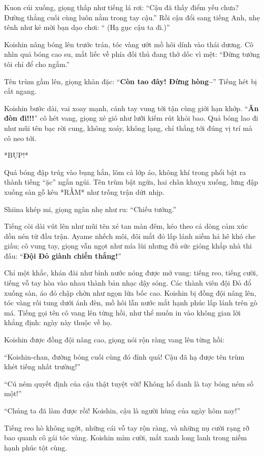 \documentclass[../main.tex]{subfiles}
\begin{document}
Kuon cúi xuống, giọng thấp như tiếng lá rơi: ``Cậu đã thấy điểm yếu chưa? Đường thẳng cuối cùng luôn nằm trong tay cậu.'' Rồi cậu đổi sang tiếng Anh, nhẹ tênh như kẻ mời bạn dạo chơi: `` (Hạ gục cậu ta đi.)''

Koishin nâng bóng lên trước trán, tóc vàng ướt mồ hôi dính vào thái dương. Cô nhìn quả bóng cao su, mắt liếc về phía đối thủ đang thở dốc vì mệt:  ``Đừng tưởng tôi chỉ để cho ngắm.''

Tên trùm gầm lên, giọng khàn đặc: ``\textbf{Còn tao đây! Đừng hòng--}'' Tiếng hét bị cắt ngang.

Koishin bước dài, vai xoay mạnh, cánh tay vung tới tận cùng giới hạn khớp. ``\textbf{Ăn đòn đi!!!}'' cô hét vang, giọng xé gió như lưỡi kiếm rút khỏi bao. Quả bóng lao đi như mũi tên bạc rời cung, không xoáy, không lạng, chỉ thẳng tới đúng vị trí mà cô neo tới.

*BỤP!*

Quả bóng đập trúg vào bụng hắn, lõm cả lớp áo, không khí trong phổi bật ra thành tiếng ``ặc'' ngắn ngủi. Tên trùm bật ngửa, hai chân khuỵu xuống, lưng đập xuống sàn gỗ kêu *RẦM* như trống trận dứt nhịp.

Shiina khép mi, giọng ngân nhẹ như ru: ``Chiếu tướng.''

Tiếng còi dài vút lên như mũi tên xé tan màn đêm, kéo theo cả dòng cảm xúc dồn nén từ đầu trận. Ayame nhếch môi, đôi mắt đỏ lấp lánh niềm hả hê khó che giấu; cô vung tay, giọng vẫn ngọt như mía lùi nhưng đủ sức gióng khắp nhà thi đấu: ``\textbf{Đội Đỏ giành chiến thắng!}''

Chỉ một khắc, khán đài như bình nước nóng được mở vung: tiếng reo, tiếng cười, tiếng vỗ tay hòa vào nhau thành bản nhạc dậy sóng. Các thành viên đội Đỏ đổ xuống sàn, áo đỏ chập chờn như ngọn lửa bốc cao. Koishin bị đồng đội nâng lên, tóc vàng rối tung dưới ánh đèn, mồ hôi lẫn nước mắt hạnh phúc lấp lánh trên gò má. Tiếng gọi tên cô vang lên từng hồi, như thể muốn in vào không gian lời khẳng định: ngày này thuộc về họ.

Koishin được đồng đội nâng cao, giọng nói rộn ràng vang lên từng hồi:

``Koishin-chan, đường bóng cuối cùng đó đỉnh quá! Cậu đã hạ được tên trùm khét tiếng nhất trường!''

``Cú ném quyết định của cậu thật tuyệt vời! Không hổ danh là tay bóng ném số một!''

``Chúng ta đã làm được rồi! Koishin, cậu là người hùng của ngày hôm nay!''

Tiếng reo hò không ngớt, những cái vỗ tay rộn ràng, và những nụ cười rạng rỡ bao quanh cô gái tóc vàng. Koishin mỉm cười, mắt xanh long lanh trong niềm hạnh phúc tột cùng.
\end{document}
